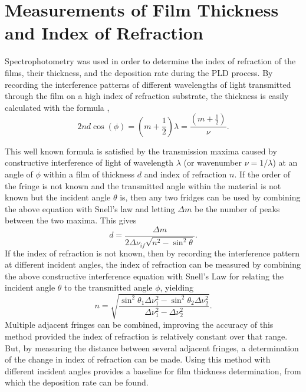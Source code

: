 \vspace{12pt}
\section{Measurements of Film Thickness and Index of Refraction}
Spectrophotometry was used in order to determine the index of refraction of the films, their thickness, and the deposition rate during the PLD process. By recording the interference patterns of different wavelengths of light transmitted through the film on a high index of refraction substrate, the thickness is easily calculated with the formula \cite{Harrick1971},
 \begin{equation}
    2nd \cos(\phi) = \left(m+\frac{1}{2}\right) \lambda = \frac{\left(m+\frac{1}{2}\right)}{\nu}.
 \end{equation}

This well known formula is satisfied by the transmission maxima caused by constructive interference of light of wavelength $\lambda$ (or wavenumber $\nu = 1/\lambda$) at an angle of $\phi$ within a film of thickness $d$ and index of refraction $n$. If the order of the fringe is not known and the transmitted angle within the material is not known but the incident angle $\theta$ is, then any two fridges can be used by combining the above equation with Snell's law and letting $\Delta m$ be the number of peaks between the two maxima. This gives
 \begin{equation}
     d = \frac{\Delta m}{2 \Delta \nu_{if} \sqrt{n^2-\sin^2{\theta}}}.
     \label{eq:film:thickness}
 \end{equation}
If the index of refraction is not known, then by recording the interference pattern at different incident angles, the index of refraction can be measured by combining the above constructive interference equation with Snell's Law for relating the incident angle $\theta$ to the transmitted angle $\phi$, yielding 
 \begin{equation}
     n = \sqrt{\frac{\sin^2{\theta_1}\Delta\nu_1^2-\sin^2{\theta_2}\Delta\nu_2^2}{\Delta\nu_1^2-\Delta\nu_2^2}}.
     \label{eq:film:index}
 \end{equation}
Multiple adjacent fringes can be combined, improving the accuracy of this method provided the index of refraction is relatively constant over that range. But, by measuring the distance between several adjacent fringes, a determination of the change in index of refraction can be made. Using this method with different incident angles provides a baseline for film thickness determination, from which the deposition rate can be found. 

